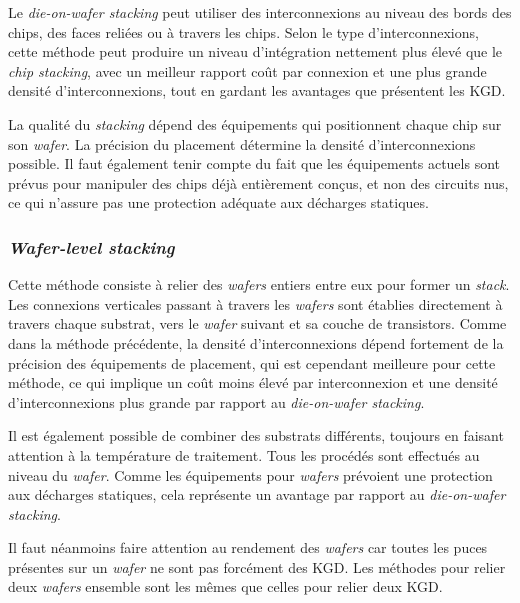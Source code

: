 Le \textit{die-on-wafer stacking} peut utiliser des interconnexions au niveau des bords des chips, des faces reliées ou à travers les chips. Selon le type d'interconnexions, cette méthode peut produire un niveau d'intégration nettement plus élevé que le \textit{chip stacking}, avec un meilleur rapport coût par connexion et une plus grande densité d'interconnexions, tout en gardant les avantages que présentent les KGD.

La qualité du \textit{stacking} dépend des équipements qui positionnent chaque chip sur son \textit{wafer}. La précision du placement détermine la densité d'interconnexions possible. Il faut également tenir compte du fait que les équipements actuels sont prévus pour manipuler des chips déjà entièrement conçus, et non des circuits nus, ce qui n'assure pas une protection adéquate aux décharges statiques.

\subsubsection*{\textit{Wafer-level stacking}}

Cette méthode consiste à relier des \textit{wafers} entiers entre eux pour former un \textit{stack}. Les connexions verticales passant à travers les \textit{wafers} sont établies directement à travers chaque substrat, vers le \textit{wafer} suivant et sa couche de transistors. Comme dans la méthode précédente, la densité d'interconnexions dépend fortement de la précision des équipements de placement, qui est cependant meilleure pour cette méthode, ce qui implique un coût moins élevé par interconnexion et une densité d'interconnexions plus grande par rapport au \textit{die-on-wafer stacking}.

Il est également possible de combiner des substrats différents, toujours en faisant attention à la température de traitement. Tous les procédés sont effectués au niveau du \textit{wafer}. Comme les équipements pour \textit{wafers} prévoient une protection aux décharges statiques, cela représente un avantage par rapport au \textit{die-on-wafer stacking}.

Il faut néanmoins faire attention au rendement des \textit{wafers} car toutes les puces présentes sur un \textit{wafer} ne sont pas forcément des KGD. Les méthodes pour relier deux \textit{wafers} ensemble sont les mêmes que celles pour relier deux KGD.
